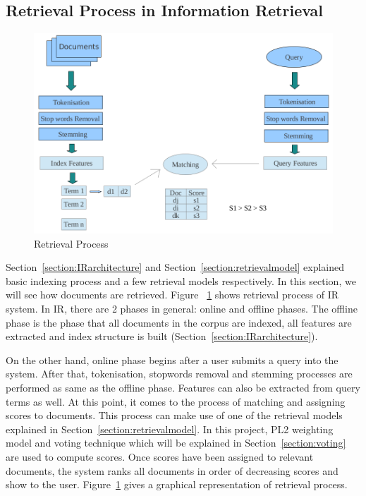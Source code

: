 \subsection{Retrieval Process in Information Retrieval}\label{section:retrieving}
\begin{figure}
\centering
\includegraphics[scale=0.3]{./figures/retrieval.png}
\caption{Retrieval Process} \label{fig:retrieval} 
\end{figure}
Section~\ref{section:IRarchitecture} and Section~\ref{section:retrievalmodel} explained basic indexing process and a few retrieval models respectively.
In this section, we will see how documents are retrieved. Figure ~\ref{fig:retrieval} shows
retrieval process of IR system. In IR, there are 2 phases in general:
online and offline phases. The offline phase is the phase that all documents in the corpus are indexed, all features are extracted 
and index structure is built (Section~\ref{section:IRarchitecture}). 


On the other hand, online phase begins after a user submits a query into the system. After that, tokenisation, stopwords removal and stemming processes 
are performed as same as the offline phase.
Features can also be extracted from query terms as well. At this point, it comes to the process of matching and assigning scores to documents.
This process can make use of one of the retrieval models explained in Section~\ref{section:retrievalmodel}. In this project, PL2 weighting model and voting
technique which will be explained in Section~\ref{section:voting} are used to compute scores.
Once scores have been assigned to relevant documents, the system ranks all documents in order of decreasing scores and 
show to the user. Figure~\ref{fig:retrieval} gives a graphical representation of retrieval process.


